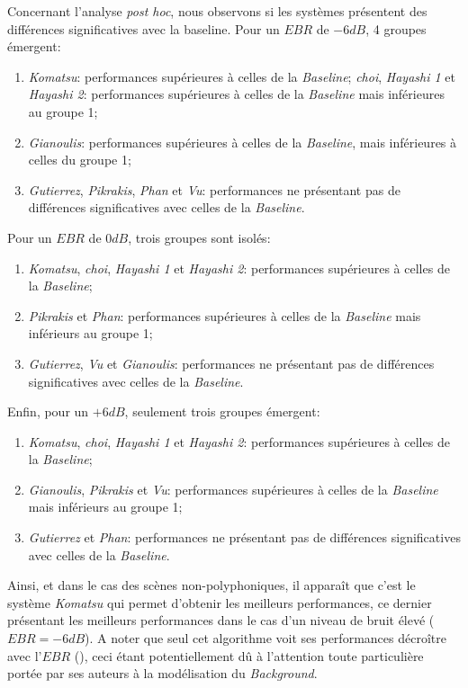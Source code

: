 Concernant l'analyse \emph{post hoc}, nous observons si les systèmes présentent des différences significatives avec la baseline. Pour un $EBR$ de $-6dB$, 4 groupes émergent:

\begin{enumerate}
\item \emph{Komatsu}: performances supérieures à celles de la \emph{Baseline};
\emph{choi}, \emph{Hayashi 1} et \emph{Hayashi 2}: performances supérieures à celles de la \emph{Baseline} mais inférieures au groupe 1;
\item \emph{Gianoulis}: performances supérieures à celles de la \emph{Baseline}, mais inférieures à celles du groupe 1;
\item \emph{Gutierrez}, \emph{Pikrakis}, \emph{Phan} et \emph{Vu}: performances ne présentant pas de différences significatives avec celles de la \emph{Baseline}.
\end{enumerate}

Pour un $EBR$ de $0dB$, trois groupes sont isolés: 

\begin{enumerate}
\item \emph{Komatsu}, \emph{choi}, \emph{Hayashi 1} et \emph{Hayashi 2}: performances supérieures à celles de la \emph{Baseline};
\item \emph{Pikrakis} et \emph{Phan}: performances supérieures à celles de la \emph{Baseline} mais inférieurs au groupe 1;
\item \emph{Gutierrez}, \emph{Vu} et \emph{Gianoulis}: performances ne présentant pas de différences significatives avec celles de la \emph{Baseline}.
\end{enumerate}

Enfin, pour un $+6dB$, seulement trois groupes émergent:

\begin{enumerate}
\item \emph{Komatsu}, \emph{choi}, \emph{Hayashi 1} et \emph{Hayashi 2}: performances supérieures à celles de la \emph{Baseline};
\item \emph{Gianoulis}, \emph{Pikrakis} et \emph{Vu}: performances supérieures à celles de la \emph{Baseline} mais inférieurs au groupe 1;
\item \emph{Gutierrez} et \emph{Phan}: performances ne présentant pas de différences significatives avec celles de la \emph{Baseline}.
\end{enumerate}

Ainsi, et dans le cas des scènes non-polyphoniques, il apparaît que c'est le système \emph{Komatsu} qui permet d'obtenir les meilleurs performances, ce dernier présentant les meilleurs performances dans le cas d'un niveau de bruit élevé ($EBR=-6dB$). A noter que seul cet algorithme voit ses performances décroître avec l'$EBR$ (), ceci étant potentiellement dû à l'attention toute particulière portée par ses auteurs à la modélisation du \emph{Background}.

